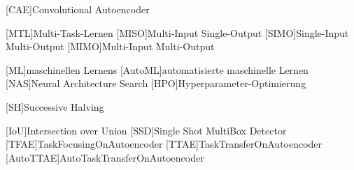 \begin{acronym}[IEEE]
	
	[CAE]{Convolutional Autoencoder}	
	
	[MTL]{Multi-Task-Lernen}		
	[MISO]{Multi-Input Single-Output}	
	[SIMO]{Single-Input Multi-Output}	
	[MIMO]{Multi-Input Multi-Output}	
	
	[ML]{maschinellen Lernens}
	[AutoML]{automatisierte maschinelle Lernen}
	[NAS]{Neural Architecture Search}
	[HPO]{Hyperparameter-Optimierung}
	
	[SH]{Successive Halving}	
	
	[IoU]{Intersection over Union}
	[SSD]{Single Shot MultiBox Detector}
	[TFAE]{TaskFocusingOnAutoencoder}
	[TTAE]{TaskTransferOnAutoencoder}
	[AutoTTAE]{AutoTaskTransferOnAutoencoder}
			
\end{acronym}
